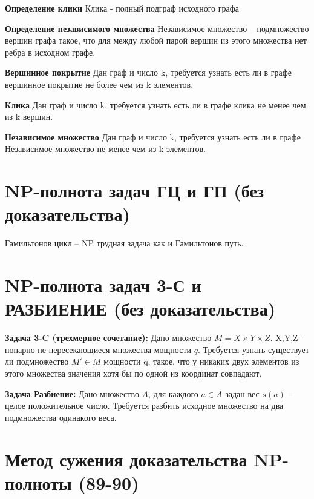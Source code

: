 \documentclass[40pt]{article}
\begin{document}
   \par \textbf{Определение клики} Клика - полный подграф исходного графа
 
   \par \textbf{Определение независимого множества} Независимое множество -- подмножество вершин графа такое, что для между любой парой вершин из этого множества нет ребра в исходном графе.
 
   \par \textbf{Вершинное покрытие} Дан граф и число k, требуется узнать есть ли в графе вершинное покрытие не более чем из k элементов. 
 
   \par \textbf{Клика} Дан граф и число k, требуется узнать есть ли в графе клика не менее чем из k вершин. 
 
   \par \textbf{Независимое множество} Дан граф и число k, требуется узнать есть ли в графе Независимое множество не менее чем из k элементов.
   
\section{NP-полнота задач ГЦ и ГП (без доказательства)}

\par Гамильтонов цикл -- NP трудная задача как и Гамильтонов путь.

\section{NP-полнота задач 3-С и РАЗБИЕНИЕ (без доказательства) }

\par \textbf{Задача 3-C (трехмерное сочетание):} Дано множество $M = X \times Y \times Z$. X,Y,Z - попарно не пересекающиеся множества мощности $q$. Требуется узнать существует ли подмножество $M' \in M$ мощности q, такое, что у никаких двух элементов из этого множества значения хотя бы по одной из координат совпадают.
 
 
    \par \textbf{Задача Разбиение:} Дано множество $A$, для каждого $a \in A$ задан вес $s(a)$ -- целое положительное число.
    Требуется разбить исходное множество на два подмножества одинакого веса.
    
    
\section{Метод сужения доказательства NP-полноты (89-90)}
\end{document}
